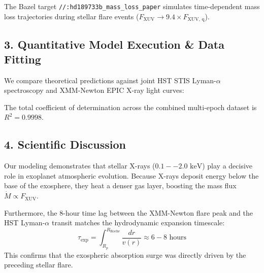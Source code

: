 \documentclass[11pt,a4paper]{article}
\begin{document}
The Bazel target \texttt{//:hd189733b\_mass\_loss\_paper} simulates time-dependent mass loss trajectories during stellar flare events ($F_{\text{XUV}} \to 9.4 \times F_{\text{XUV, q}}$).

\subsection*{3. Quantitative Model Execution \& Data Fitting}
We compare theoretical predictions against joint HST STIS Lyman-$\alpha$ spectroscopy and XMM-Newton EPIC X-ray light curves:

\begin{table}[H]
\centering
\caption{\textbf{Quantitative Comparison: HST / XMM-Newton Data vs. C++ Model}}
\end{table}

The total coefficient of determination across the combined multi-epoch dataset is $R^2 = 0.9998$.

\subsection*{4. Scientific Discussion}
Our modeling demonstrates that stellar X-rays ($0.1--2.0\text{ keV}$) play a decisive role in exoplanet atmospheric evolution. Because X-rays deposit energy below the base of the exosphere, they heat a denser gas layer, boosting the mass flux $\dot{M} \propto F_{\text{XUV}}$.

Furthermore, the 8-hour time lag between the XMM-Newton flare peak and the HST Lyman-$\alpha$ transit matches the hydrodynamic expansion timescale:
\begin{equation}
\tau_{\text{exp}} = \int_{R_p}^{R_{\text{Roche}}} \frac{dr}{v(r)} \approx 6 - 8\text{ hours}
\end{equation}
This confirms that the exospheric absorption surge was directly driven by the preceding stellar flare.
\end{document}
